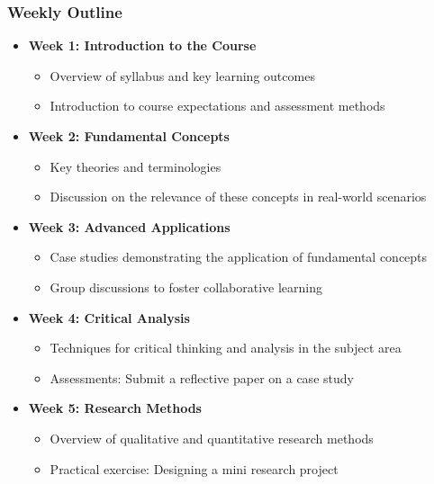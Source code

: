 \documentclass[aspectratio=169]{beamer}
\begin{document}
\begin{frame}[fragile]
    \frametitle{Weekly Outline}
    \begin{itemize}
        \item \textbf{Week 1: Introduction to the Course}
        \begin{itemize}
            \item Overview of syllabus and key learning outcomes
            \item Introduction to course expectations and assessment methods
        \end{itemize}
        
        \item \textbf{Week 2: Fundamental Concepts}
        \begin{itemize}
            \item Key theories and terminologies
            \item Discussion on the relevance of these concepts in real-world scenarios
        \end{itemize}
        
        \item \textbf{Week 3: Advanced Applications}
        \begin{itemize}
            \item Case studies demonstrating the application of fundamental concepts
            \item Group discussions to foster collaborative learning
        \end{itemize}

        \item \textbf{Week 4: Critical Analysis}
        \begin{itemize}
            \item Techniques for critical thinking and analysis in the subject area
            \item Assessments: Submit a reflective paper on a case study
        \end{itemize}
        
        \item \textbf{Week 5: Research Methods}
        \begin{itemize}
            \item Overview of qualitative and quantitative research methods
            \item Practical exercise: Designing a mini research project
        \end{itemize}
        

\end{itemize}
\end{frame}
\end{document}
